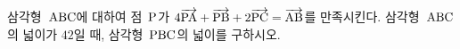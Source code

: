 삼각형~$\pt{ABC}$에 대하여 점~$\pt{P}$가 $4\vecAB{PA}+\vecAB{PB}+2\vecAB{PC}=\vecAB{AB}$를 만족시킨다. 삼각형~$\pt{ABC}$의 넓이가 $42$일 때, 삼각형~$\pt{PBC}$의 넓이를 구하시오.
